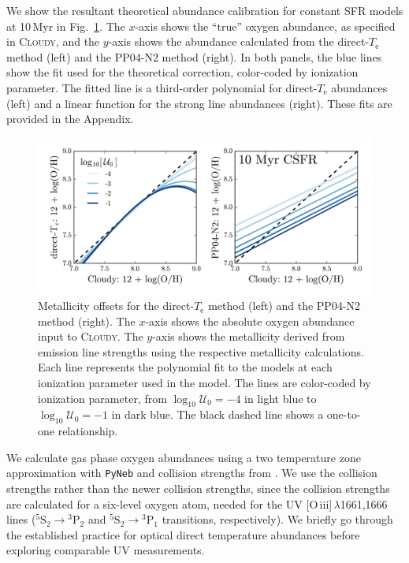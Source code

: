 \documentclass[preprint2]{aastex62}
\newcommand{\Cloudy}{\textsc{Cloudy}\xspace}
\newcommand{\oiii}{[O\,{\sc iii}]\xspace}
\newcommand{\Myr}{$\,$Myr\xspace}
\newcommand{\logten}{\ensuremath{\log_{10}}}
\newcommand{\logUeq}[1]{\ensuremath{\logten \mathcal{U}_0 = #1}}
\newcommand{\Te}{\ensuremath{T_{\mathrm{e}}}\xspace}
\begin{document}
We show the resultant theoretical abundance calibration for constant SFR models at 10\Myr in Fig.~\ref{fig:offset}. The $x$-axis shows the ``true'' oxygen abundance, as specified in \Cloudy, and the $y$-axis shows the abundance calculated from the direct-\Te method (left) and the PP04-N2 method (right). In both panels, the blue lines show the fit used for the theoretical correction, color-coded by ionization parameter. The fitted line is a third-order polynomial for direct-\Te abundances (left) and a linear function for the strong line abundances (right). These fits are provided in the Appendix.

\begin{figure}
  \begin{center}
    \includegraphics[width=\linewidth]{figs/f2.png}
    \caption{Metallicity offsets for the direct-\Te method (left) and the PP04-N2 method (right). The $x$-axis shows the absolute oxygen abundance input to \Cloudy. The $y$-axis shows the metallicity derived from emission line strengths using the respective metallicity calculations. Each line represents the polynomial fit to the models at each ionization parameter used in the model. The lines are color-coded by ionization parameter, from \logUeq{-4} in light blue to \logUeq{-1} in dark blue. The black dashed line shows a one-to-one relationship.}
    \label{fig:offset}
  \end{center}
\end{figure}



We calculate gas phase oxygen abundances using a two temperature zone approximation with {\tt PyNeb} \citep{PyNeb} and collision strengths from \citet{Aggarwal+1999}. We use the \citet{Aggarwal+1999} collision strengths rather than the newer \citet{Storey+2014} collision strengths, since the \citet{Aggarwal+1999} collision strengths are calculated for a six-level oxygen atom, needed for the UV \oiii$\,\lambda$1661,1666 lines (${}^5\mathrm{S}_2 \rightarrow {}^3\mathrm{P}_2$ and ${}^5\mathrm{S}_2 \rightarrow {}^3\mathrm{P}_1$ transitions, respectively).  We briefly go through the established practice for optical direct temperature abundances before exploring comparable UV measurements.
\end{document}
